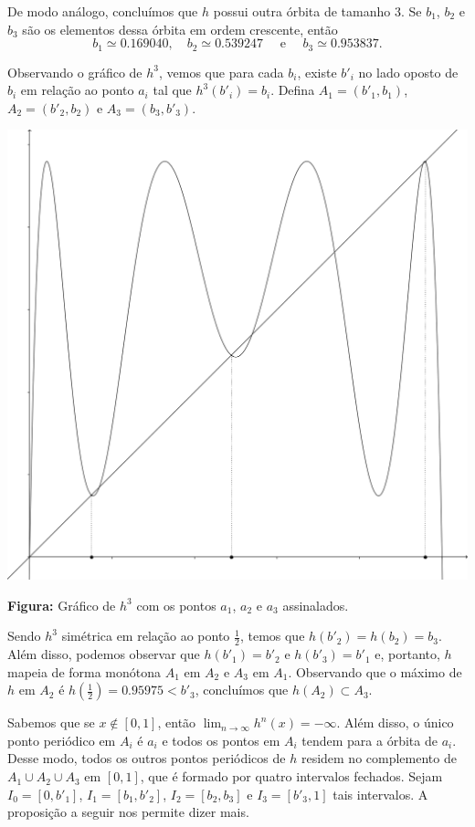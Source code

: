 De modo análogo, concluímos que $h$ possui outra órbita de tamanho $3$. Se $b_1$, $b_2$ e $b_3$ são os elementos dessa órbita em ordem crescente, então
$$b_1 \simeq 0.169040, \quad b_2 \simeq 0.539247 \quad  \text{ e } \quad b_3 \simeq 0.953837.$$

Observando o gráfico de $h^3$, vemos que para cada $b_i$, existe $b'_i$ no lado oposto de $b_i$ em relação ao ponto $a_i$ tal que $h^3(b'_i) = b_i$. Defina $A_1 = (b'_1, b_1)$, $A_2 = (b'_2, b_2)$ e $A_3 = (b_3, b'_3)$.

\begin{center}
\includegraphics[scale=0.15]{images/matriz-de-transicao-1.png}

{\small \textbf{Figura:} Gráfico de $h^3$ com os pontos $a_1$, $a_2$ e $a_3$ assinalados.}
\end{center}

Sendo $h^3$ simétrica em relação ao ponto $\frac{1}{2}$, temos que $h(b'_2) = h(b_2) = b_3$.
Além disso, podemos observar que $h(b'_1) = b'_2$ e $h(b'_3) = b'_1$ e, portanto, $h$ mapeia de forma monótona $A_1$ em $A_2$ e $A_3$ em $A_1$. Observando que o máximo de $h$ em $A_2$ é $h( \frac{1}{2}) = 0.95975 < b'_3$, concluímos que $h(A_2) \subset A_3$.

Sabemos que se $x \notin [0, 1]$, então $\lim_{n \to \infty} h^n(x) = -\infty$.
Além disso, o único ponto periódico em $A_i$ é $a_i$ e todos os pontos em $A_i$ tendem para a órbita de $a_i$.
Desse modo, todos os outros pontos periódicos de $h$ residem no complemento de $A_1 \cup A_2 \cup A_3$ em $[0, 1]$, que é formado por quatro intervalos fechados. Sejam $I_0 = [0, b'_1]$, $I_1 = [b_1, b'_2]$, $I_2 = [b_2, b_3]$ e $I_3 = [b'_3, 1]$ tais intervalos. A proposição a seguir nos permite dizer mais.

